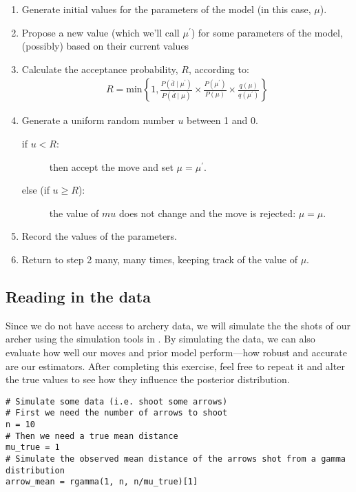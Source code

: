 \begin{enumerate}
	\item Generate initial values for the parameters of the model (in this case, $\mu$).
	\item Propose a new value (which we'll call $\mu^\prime$) for some parameters of the model, (possibly) based on their current values \label{sect:MH:step2}
	\item Calculate the acceptance probability, $R$, according to:
	\begin{align*}
		R = \text{min}\left\{1, \frac{P(\bar d \mid \mu^\prime)}{P(\bar d \mid \mu)} \times \frac{P(\mu^\prime)}{P(\mu)} \times \frac{q(\mu)}{q(\mu^\prime)} \right\}
	\end{align*}\label{sect:MH:step3}
	\item Generate a uniform random number $u$ between 1 and 0. 
    \begin{description}
        \item [if $u<R$:] then accept the move and set $\mu = \mu^\prime$.
        \item [else (if $u\geq R$):] the value of $mu$ does not change and the move is rejected: $\mu = \mu$.
    \end{description}\label{sect:MH:step4}
	\item Record the values of the parameters.\label{sect:MH:step5}
	\item Return to step 2 many, many times, keeping track of the value of $\mu$.\label{sect:MH_alg:step6}
\end{enumerate}

\subsection{Reading in the data}
Since we do not have access to archery data, we will simulate the the shots of our archer using the simulation tools in \RevBayes.
By simulating the data, we can also evaluate how well our moves and prior model perform---\IE how robust and accurate are our estimators.
After completing this exercise, feel free to repeat it and alter the true values to see how they influence the posterior distribution.
{\tt \begin{snugshade*}
\begin{lstlisting}    
# Simulate some data (i.e. shoot some arrows)
# First we need the number of arrows to shoot
n = 10
# Then we need a true mean distance
mu_true = 1
# Simulate the observed mean distance of the arrows shot from a gamma distribution
arrow_mean = rgamma(1, n, n/mu_true)[1]
\end{lstlisting}
\end{snugshade*}}

